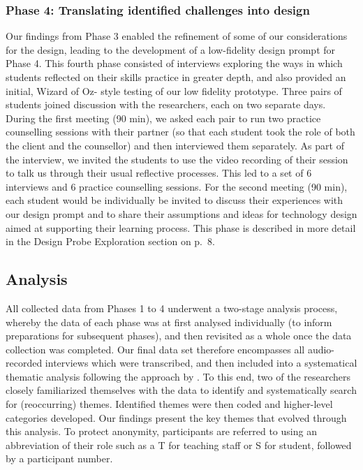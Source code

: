 \documentclass{sigchi}
\begin{document}
\subsubsection{Phase 4: Translating identified challenges into design}
Our findings from Phase 3 enabled the refinement of some of our considerations for the design, leading to the development of a low-fidelity design prompt for Phase 4. This fourth phase consisted of interviews exploring the ways in which students reflected on their skills practice in greater depth, and also provided an initial, Wizard of Oz- style testing of our low fidelity prototype. Three pairs of students joined discussion with the researchers, each on two separate days. During the first meeting (90 min), we asked each pair to run two practice counselling sessions with their partner (so that each student took the role of both the client and the counsellor) and then interviewed them separately. As part of the interview, we invited the students to use the video recording of their session to talk us through their usual reflective processes. This led to a set of 6 interviews and 6 practice counselling sessions. For the second meeting (90 min), each student would be individually be invited to discuss their experiences with our design prompt and to share their assumptions and ideas for technology design aimed at supporting their learning process. This phase is described in more detail in the Design Probe Exploration section on p.~8. 


\subsection{Analysis}
All collected data from Phases 1 to 4 underwent a two-stage analysis process, whereby the data of each phase was at first analysed individually (to inform preparations for subsequent phases), and then revisited as a whole once the data collection was completed. Our final data set therefore encompasses all audio-recorded interviews which were transcribed, and then included into a systematical thematic analysis following the approach by  \cite{Braun2006}. To this end, two of the researchers closely familiarized themselves with the data to identify and systematically search for (reoccurring) themes. Identified themes were then coded and higher-level categories developed. Our findings present the key themes that evolved through this analysis. To protect anonymity, participants are referred to using an abbreviation of their role such as a T for teaching staff or S for student, followed by a participant number.
\end{document}
